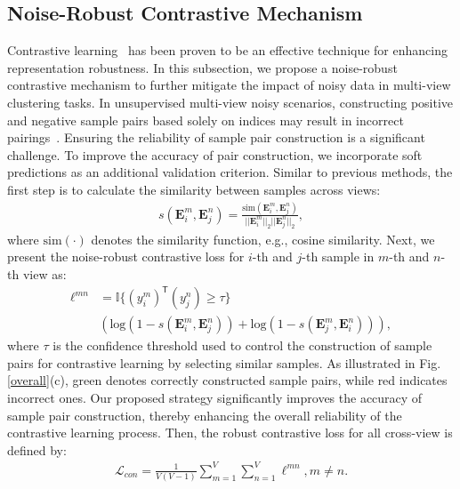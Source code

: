\documentclass{article}
\theoremstyle{plain}
\theoremstyle{definition}
\theoremstyle{remark}
\begin{document}
\subsection{Noise-Robust Contrastive Mechanism}
Contrastive learning~\cite{Graphlearner} has been proven to be an effective technique for enhancing representation robustness. In this subsection, we propose a noise-robust contrastive mechanism to further mitigate the impact of noisy data in multi-view clustering tasks. In unsupervised multi-view noisy scenarios, constructing positive and negative sample pairs based solely on indices may result in incorrect pairings~\cite{sun2024robust}. Ensuring the reliability of sample pair construction is a significant challenge. To improve the accuracy of pair construction, we incorporate soft predictions as an additional validation criterion. Similar to previous methods, the first step is to calculate the similarity between samples across views:
\begin{equation}
\begin{aligned}
s(\textbf{E}^m_i, \textbf{E}^n_j) = \frac{\text{sim}(\textbf{E}^m_i, \textbf{E}^n_j)}{||\textbf{E}^m_i||_2 ||\textbf{E}^n_j||_2},
\end{aligned}
\label{sim}
\end{equation}
where $\text{sim}(\cdot)$ denotes the similarity function, e.g., cosine similarity. Next, we present the noise-robust contrastive loss for $i$-th and $j$-th sample in $m$-th and $n$-th view as:
\begin{equation}
\begin{aligned}
\ell^{mn} &= \mathbb{I}\{(y^m_i)^\mathsf{T}(y^n_j) \ge \tau\}\\
&\left( \text{log} (1-s(\textbf{E}^m_i, \textbf{E}^n_j)) + \text{log} (1-s(\textbf{E}^m_j, \textbf{E}^n_i)) \right), 
\end{aligned}
\label{contra_loss}
\end{equation}
where $\tau$ is the confidence threshold used to control the construction of sample pairs for contrastive learning by selecting similar samples. As illustrated in Fig.\ref{overall}(c), green denotes correctly constructed sample pairs, while red indicates incorrect ones. Our proposed strategy significantly improves the accuracy of sample pair construction, thereby enhancing the overall reliability of the contrastive learning process. Then, the robust contrastive loss for all cross-view is defined by:
\begin{equation}
\begin{aligned}
\mathcal{L}_{con} =\frac{1}{V(V-1)} \sum_{m=1}^V\sum_{n=1}^V \ell^{mn}, m \neq n.
\end{aligned}
\label{robu_loss}
\end{equation}
\end{document}
